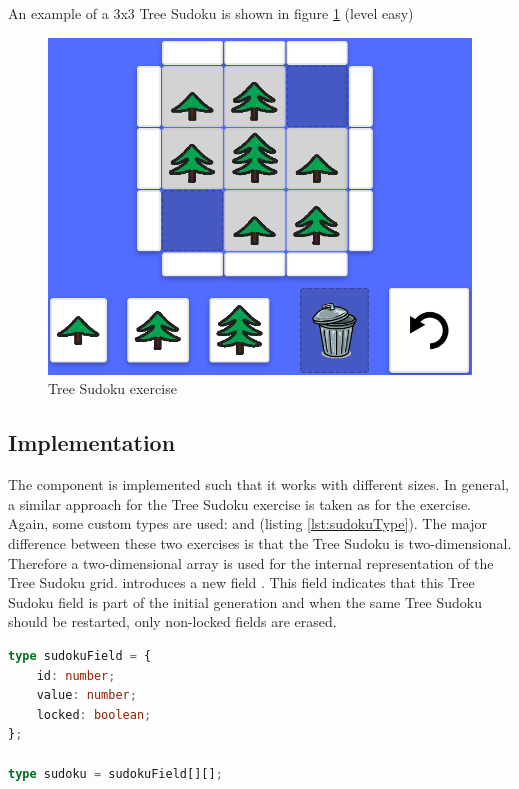 \begin{example}
    An example of a 3x3 Tree Sudoku is shown in figure \ref{fig:tree_sudoku_example_exercise} (level easy)
\end{example}

\begin{figure} 
    \centering
    \includegraphics[width=0.6 \columnwidth]{figures/tree_sudoku_example_exercise.png}
    \caption{Tree Sudoku exercise} 
    \label{fig:tree_sudoku_example_exercise} 
\end{figure}

\subsection{Implementation}

The  component is implemented such that it works with different sizes. In general, a similar approach for the Tree Sudoku exercise is taken as for the  exercise. Again, some custom types are used:  and  (listing \ref{lst:sudokuType}). The major difference between these two exercises is that the Tree Sudoku is two-dimensional. Therefore a two-dimensional array is used for the internal representation of the Tree Sudoku grid.  introduces a new field . This field indicates that this Tree Sudoku field is part of the initial generation and when the same Tree Sudoku should be restarted, only non-locked fields are erased.

\begin{lstlisting}[language=TypeScript,caption={Definition of the custom sudoku and sudokuField type},label={lst:sudokuType}]
type sudokuField = {
    id: number;
    value: number;
    locked: boolean;
};

type sudoku = sudokuField[][];
\end{lstlisting}

